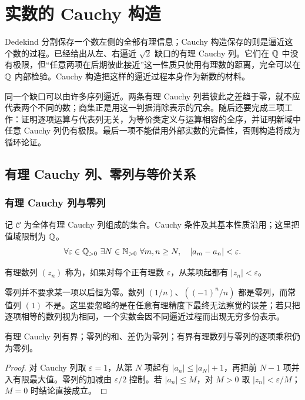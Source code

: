 \chapter{实数的 Cauchy 构造}
\label{chap:cauchy-construction}

Dedekind 分割保存一个数左侧的全部有理信息；Cauchy 构造保存的则是逼近这个数的过程。已经给出从左、右逼近 \(\sqrt2\) 缺口的有理 Cauchy 列。它们在 \(\mathbb{Q}\) 中没有极限，但“任意两项在后期彼此接近”这一性质只使用有理数的距离，完全可以在 \(\mathbb{Q}\) 内部检验。Cauchy 构造把这样的逼近过程本身作为新数的材料。

同一个缺口可以由许多序列逼近。两条有理 Cauchy 列若彼此之差趋于零，就不应代表两个不同的数；商集正是用这一判据消除表示的冗余。随后还要完成三项工作：证明逐项运算与代表列无关，为等价类定义与运算相容的全序，并证明新域中任意 Cauchy 列仍有极限。最后一项不能借用外部实数的完备性，否则构造将成为循环论证。

\section{有理 Cauchy 列、零列与等价关系}

\subsection{有理 Cauchy 列与零列}


记 \(\mathcal C\) 为全体有理 Cauchy 列组成的集合。Cauchy 条件及其基本性质沿用；这里把值域限制为 \(\mathbb{Q}\)。
\[
\forall\varepsilon\in\mathbb{Q}_{>0}\ \exists N\in\mathbb{N}_{>0}\
 \forall m,n\ge N,\quad |a_m-a_n|<\varepsilon.
\]

\begin{definition}
有理数列 \((z_n)\) 称为，如果对每个正有理数 \(\varepsilon\)，从某项起都有 \(|z_n|<\varepsilon\)。
\end{definition}

零列并不要求某一项以后恒为零。数列 \((1/n)\)、\(((-1)^n/n)\) 都是零列，而常值列 \((1)\) 不是。这里要忽略的是在任意有理精度下最终无法察觉的误差；若只把逐项相等的数列视为相同，一个实数会因不同逼近过程而出现无穷多份表示。

\begin{proposition}
有理 Cauchy 列有界；零列的和、差仍为零列；有界有理数列与零列的逐项乘积仍为零列。
\end{proposition}

\begin{proof}
对 Cauchy 列取 \(\varepsilon=1\)，从第 \(N\) 项起有 \(|a_n|\le|a_N|+1\)，再把前 \(N-1\) 项并入有限最大值。零列的加减由 \(\varepsilon/2\) 控制。若 \(|a_n|\le M\)，对 \(M>0\) 取 \(|z_n|<\varepsilon/M\)；\(M=0\) 时结论直接成立。
\end{proof}

